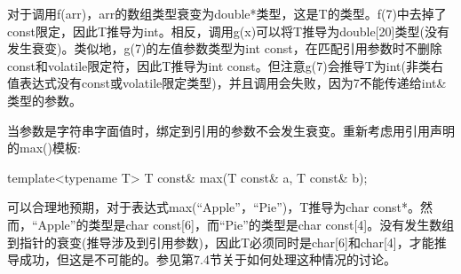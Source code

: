 对于调用f(arr)，arr的数组类型衰变为double*类型，这是T的类型。f(7)中去掉了const限定，因此T推导为int。相反，调用g(x)可以将T推导为double[20]类型(没有发生衰变)。类似地，g(7)的左值参数类型为int const，在匹配引用参数时不删除const和volatile限定符，因此T推导为int const。但注意g(7)会推导T为int(非类右值表达式没有const或volatile限定类型)，并且调用会失败，因为7不能传递给int\&类型的参数。

当参数是字符串字面值时，绑定到引用的参数不会发生衰变。重新考虑用引用声明的max()模板:

\begin{cpp}
template<typename T>
T const& max(T const& a, T const& b);
\end{cpp} 

可以合理地预期，对于表达式max(“Apple”，“Pie”)，T推导为char const*。然而，“Apple”的类型是char const[6]，而“Pie”的类型是char const[4]。没有发生数组到指针的衰变(推导涉及到引用参数)，因此T必须同时是char[6]和char[4]，才能推导成功，但这是不可能的。参见第7.4节关于如何处理这种情况的讨论。























 